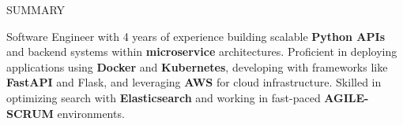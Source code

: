\documentclass{resume} %
\begin{document}




\begin{rSection}{SUMMARY}


{Software Engineer with 4 years of experience building scalable \textbf{Python APIs} and backend systems within \textbf{microservice} architectures. Proficient in deploying applications using \textbf{Docker} and \textbf{Kubernetes}, developing with frameworks like \textbf{FastAPI} and Flask, and leveraging \textbf{AWS} for cloud infrastructure. Skilled in optimizing search with \textbf{Elasticsearch} and working in fast-paced \textbf{AGILE-SCRUM} environments.}


\end{rSection}




\end{document}

